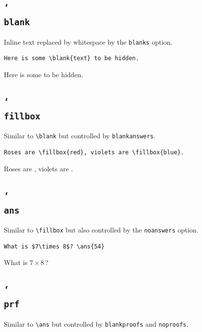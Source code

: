 \documentclass{article}
\theoremstyle{definition}
\newcommand{\vbs}{\char`\\}
\begin{document}
\subsection{\tt\vbs blank}
Inline text replaced by whitespace by the {\tt blanks} option.

\begin{Verbatim}[frame=single]
Here is some \blank{text} to be hidden.
\end{Verbatim}
Here is some  to be hidden.


\subsection{\tt\vbs fillbox}
Similar to \verb+\blank+ but controlled by \verb+blankanswers+.

\begin{Verbatim}[frame=single]
Roses are \fillbox{red}, violets are \fillbox{blue}.
\end{Verbatim}
Roses are , violets are .

\subsection{\tt\vbs ans}
Similar to \verb+\fillbox+ but also controlled by the \verb+noanswers+ option.

\begin{Verbatim}[frame=single]
What is $7\times 8$? \ans{54}
\end{Verbatim}
What is $7\times 8$\,? 

\subsection{\tt\vbs prf}
Similar to \verb+\ans+ but controlled by \verb+blankproofs+ and \verb+noproofs+.
\end{document}
